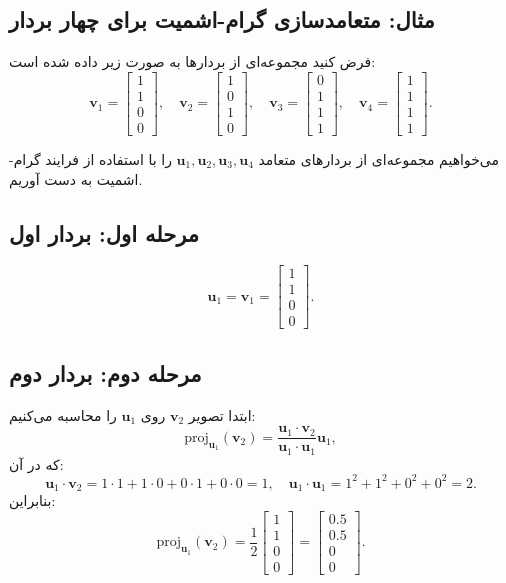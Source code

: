 \begin{example}
	\section*{مثال: متعامدسازی گرام-اشمیت برای چهار بردار}
	فرض کنید مجموعه‌ای از بردارها به صورت زیر داده شده است:
	\[
	\mathbf{v}_1 = \begin{bmatrix} 1 \\ 1 \\ 0 \\ 0 \end{bmatrix}, \quad
	\mathbf{v}_2 = \begin{bmatrix} 1 \\ 0 \\ 1 \\ 0 \end{bmatrix}, \quad
	\mathbf{v}_3 = \begin{bmatrix} 0 \\ 1 \\ 1 \\ 1 \end{bmatrix}, \quad
	\mathbf{v}_4 = \begin{bmatrix} 1 \\ 1 \\ 1 \\ 1 \end{bmatrix}.
	\]
	
	می‌خواهیم مجموعه‌ای از بردارهای متعامد \( \mathbf{u}_1, \mathbf{u}_2, \mathbf{u}_3, \mathbf{u}_4 \) را با استفاده از فرایند گرام-اشمیت به دست آوریم.
	
	\subsection*{مرحله اول: بردار اول}
	\[
	\mathbf{u}_1 = \mathbf{v}_1 = \begin{bmatrix} 1 \\ 1 \\ 0 \\ 0 \end{bmatrix}.
	\]
	
	\subsection*{مرحله دوم: بردار دوم}
	ابتدا تصویر \( \mathbf{v}_2 \) روی \( \mathbf{u}_1 \) را محاسبه می‌کنیم:
	\[
	\text{proj}_{\mathbf{u}_1}(\mathbf{v}_2) = \frac{\mathbf{u}_1 \cdot \mathbf{v}_2}{\mathbf{u}_1 \cdot \mathbf{u}_1} \mathbf{u}_1,
	\]
	که در آن:
	\[
	\mathbf{u}_1 \cdot \mathbf{v}_2 = 1 \cdot 1 + 1 \cdot 0 + 0 \cdot 1 + 0 \cdot 0 = 1, \quad
	\mathbf{u}_1 \cdot \mathbf{u}_1 = 1^2 + 1^2 + 0^2 + 0^2 = 2.
	\]
	بنابراین:
	\[
	\text{proj}_{\mathbf{u}_1}(\mathbf{v}_2) = \frac{1}{2} \begin{bmatrix} 1 \\ 1 \\ 0 \\ 0 \end{bmatrix} = \begin{bmatrix} 0.5 \\ 0.5 \\ 0 \\ 0 \end{bmatrix}.
	\]
	

\end{example}
